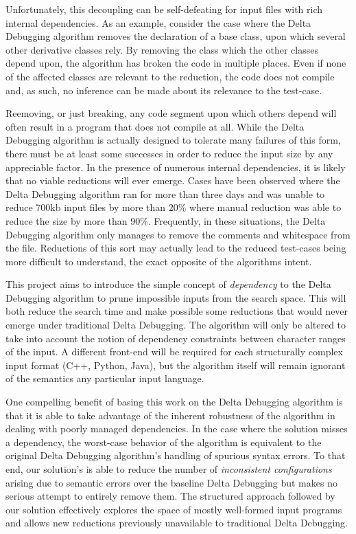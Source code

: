 \documentclass[preprint]{acm_proc_article-sp}
\begin{document}
Unfortunately, this decoupling can be self-defeating for input files with rich
internal dependencies. As an example, consider the case where the Delta
Debugging algorithm removes the declaration of a base class, upon which several
other derivative classes rely. By removing the class which the other classes
depend upon, the algorithm has broken the code in multiple places. Even if none
of the affected classes are relevant to the reduction, the code does not compile
and, as such, no inference can be made about its relevance to the test-case.

Reemoving, or just breaking, any code segment upon which others depend will
often result in a program that does not compile at all. While the Delta
Debugging algorithm is actually designed to tolerate many failures of this form,
there must be at least some successes in order to reduce the input size by any
appreciable factor. In the presence of numerous internal dependencies, it is
likely that no viable reductions will ever emerge. Cases have been observed
\citep{trex} where the Delta Debugging algorithm ran for more than three days
and was unable to reduce 700kb input files by more than $20 \%$ where manual
reduction was able to reduce the size by more than $90 \%$. Frequently, in
these situations, the Delta Debugging algorithm only manages to remove the
comments and whitespace from the file. Reductions of this sort may actually lead
to the reduced test-cases being more difficult to understand, the exact opposite
of the algorithms intent.

This project aims to introduce the simple concept of \emph{dependency} to the
Delta Debugging algorithm to prune impossible inputs from the search space.
This will both reduce the search time and make possible some reductions that
would never emerge under traditional Delta Debugging. The algorithm will only be
altered to take into account the notion of dependency constraints between
character ranges of the input. A different front-end will be required for each
structurally complex input format (C++, Python, Java), but the algorithm itself
will remain ignorant of the semantics any particular input language.

One compelling benefit of basing this work on the Delta Debugging algorithm is
that it is able to take advantage of the inherent robustness of the algorithm
in dealing with poorly managed dependencies. In the case where the solution
misses a dependency, the worst-case behavior of the algorithm is equivalent to
the original Delta Debugging algorithm's handling of spurious syntax errors.
To that end, our solution's is able to reduce the number of \emph{inconsistent
configurations} \citep{zeller99} arising due to semantic errors over the
baseline Delta Debugging but makes no serious attempt to entirely remove them.
The structured approach followed by our solution effectively explores the space
of mostly well-formed input programs and allows new reductions previously
unavailable to traditional Delta Debugging.
\end{document}
